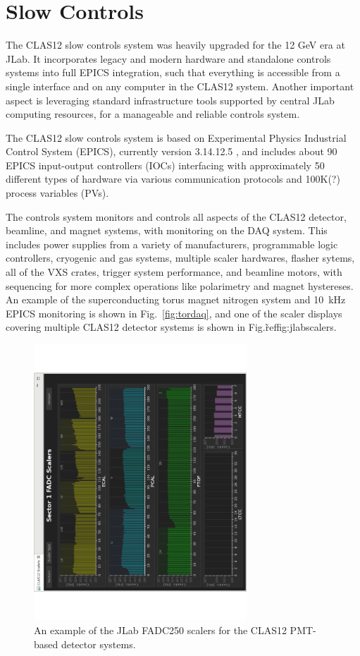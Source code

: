 \section{Slow Controls}

The CLAS12 slow controls system was heavily upgraded for the 12 GeV era at JLab.  It incorporates legacy and modern hardware and standalone controls systems into full EPICS integration, such that everything is accessible from a single interface and on any computer in the CLAS12 system.  Another important aspect is leveraging standard infrastructure tools supported by central JLab computing resources, for a manageable and reliable controls system.

The CLAS12 slow controls system is based on Experimental Physics Industrial Control System (EPICS), currently version 3.14.12.5 \cite{epics-website}, and includes about 90 EPICS input-output controllers (IOCs) interfacing with approximately 50 different types of hardware via various communication protocols and 100K(?) process variables (PVs).

The controls system monitors and controls all aspects of the CLAS12 detector, beamline, and magnet systems, with monitoring on the DAQ system.  This includes power supplies from a variety of manufacturers, programmable logic controllers, cryogenic and gas systems, multiple scaler hardwares, flasher sytems, all of the VXS crates, trigger system performance, and beamline motors, with sequencing for more complex operations like polarimetry and magnet hystereses.  An example of the superconducting torus magnet nitrogen system and 10~kHz EPICS monitoring is shown in Fig.~\ref{fig:tordaq}, and one of the scaler displays covering multiple CLAS12 detector systems is shown in Fig.\~ref{fig:jlabscalers}.

\begin{figure}[htbp]\centering
\includegraphics[width=8cm]{img/fd-scalers}
\caption{An example of the JLab FADC250 scalers for the CLAS12 PMT-based detector systems.\label{fig:jlabscalers}}
\end{figure}

